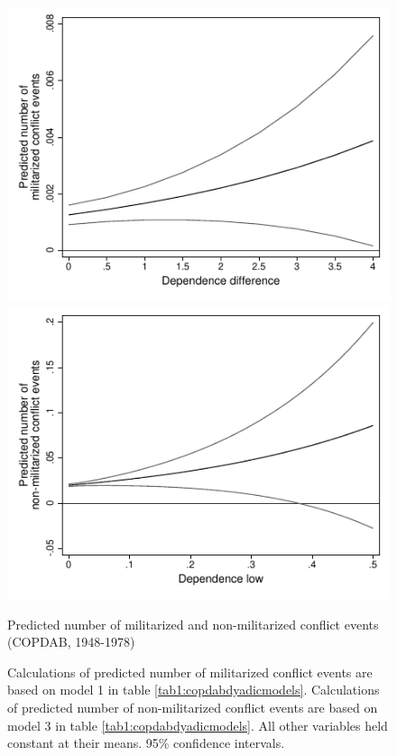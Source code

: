 \documentclass[12pt]{article}
\theoremstyle{hypothesis}
\begin{document}
\begin{figure}
\centering
\begin{minipage}{.5\textwidth}
  \centering
  \includegraphics[width=1\linewidth]{Predicted_Number_Militarized_Conflict_Events_Asymmetric_Dependence_10022016.pdf}
\end{minipage}%
\begin{minipage}{.5\textwidth}
  \centering
  \includegraphics[width=1\linewidth]{Predicted_Number_Non-Militarized_Conflict_Events_Interdependence_10022016.pdf}
\end{minipage}
\caption{Predicted number of militarized and non-militarized conflict events (COPDAB, 1948-1978)}
 \label{fig2:predictednumberevents}
\caption*{Calculations of predicted number of militarized conflict events are based on model 1 in table \ref{tab1:copdabdyadicmodels}. Calculations of predicted number of non-militarized conflict events are based on model 3 in table \ref{tab1:copdabdyadicmodels}. All other variables held constant at their means. 95\% confidence intervals.}
\end{figure}
\end{document}

